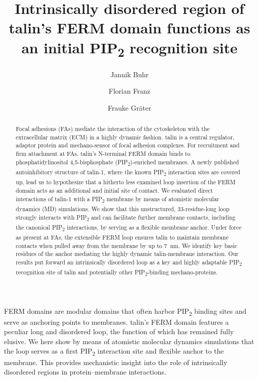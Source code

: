\documentclass[
  twocolumn]{biophys-new-mod}
\title{Intrinsically disordered region of talin's FERM domain functions
as an initial PIP\textsubscript{2} recognition site}
\author[1,2]
  {Jannik Buhr}
\author[1,2]
  {Florian Franz}
\author[1,2,*]
  {Frauke Gräter}
\affil[1]{Heidelberg Institute for Theoretical Studies}
\affil[2]{Interdisciplinary Center for Scientific Computing, Heidelberg
University}
\begin{document}
\begin{frontmatter}

\begin{abstract}
Focal adhesions (FAs) mediate the interaction of the cytoskeleton with
the extracellular matrix (ECM) in a highly dynamic fashion. talin is a
central regulator, adaptor protein and mechano-sensor of focal adhesion
complexes. For recruitment and firm attachment at FAs, talin's
N-terminal FERM domain binds to phosphatidylinositol 4,5-bisphosphate
(PIP\textsubscript{2})-enriched membranes. A newly published
autoinhibitory structure of talin-1, where the known
PIP\textsubscript{2} interaction sites are covered up, lead us to
hypothesize that a hitherto less examined loop insertion of the FERM
domain acts as an additional and initial site of contact. We evaluated
direct interactions of talin-1 with a PIP\textsubscript{2} membrane by
means of atomistic molecular dynamics (MD) simulations. We show that
this unstructured, 33-residue-long loop strongly interacts with
PIP\textsubscript{2} and can facilitate further membrane contacts,
including the canonical PIP\textsubscript{2} interactions, by serving as
a flexible membrane anchor. Under force as present at FAs, the
extensible FERM loop ensures talin to maintain membrane contacts when
pulled away from the membrane by up to 7~nm. We identify key basic
residues of the anchor mediating the highly dynamic talin-membrane
interaction. Our results put forward an intrinsically disordered loop as
a key and highly adaptable PIP\textsubscript{2} recognition site of
talin and potentially other PIP\textsubscript{2}-binding
mechano-proteins.
\end{abstract}


\begin{sigstatement}
FERM domains are modular domains that often harbor PIP\textsubscript{2}
binding sites and serve as anchoring points to membranes. talin's FERM
domain features a peculiar long and disordered loop, the function of
which has remained fully elusive. We here show by means of atomistic
molecular dynamics simulations that the loop serves as a first
PIP\textsubscript{2} interaction site and flexible anchor to the
membrane. This provides mechanistic insight into the role of
intrinsically disordered regions in protein--membrane interactions.
\end{sigstatement}


\end{frontmatter}\ifdefined\Shaded\renewenvironment{Shaded}{\begin{tcolorbox}[enhanced, boxrule=0pt, sharp corners, interior hidden, borderline west={3pt}{0pt}{shadecolor}, breakable, frame hidden]}{\end{tcolorbox}}\fi
\end{document}
